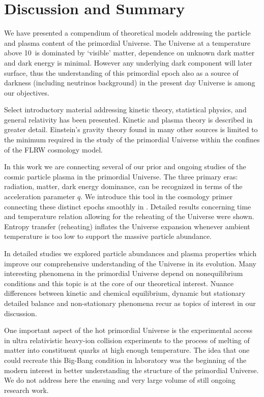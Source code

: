 \section{Discussion and Summary}\label{part6}
We have presented a compendium of theoretical models addressing the particle and plasma content of the primordial Universe. The Universe at a temperature above 10\keV\ is dominated by `visible' matter, dependence on unknown dark matter and dark energy is minimal. However any underlying dark component will later surface, thus the understanding of this primordial epoch also as a source of darkness (including neutrinos background) in the present day Universe is among our objectives.

Select introductory material addressing kinetic theory, statistical physics, and general relativity has been presented. Kinetic and plasma theory is described in greater detail. Einstein's gravity theory found in many other sources is limited to the minimum required in the study of the primordial Universe within the confines of the FLRW cosmology model. 

In this work we are connecting several of our prior and ongoing studies of the cosmic particle plasma in the primordial Universe. The three primary eras: radiation, matter, dark energy dominance, can be recognized in terms of the acceleration parameter $q$. We introduce this tool in the cosmology primer  connecting these distinct epochs smoothly in . Detailed results concerning time and temperature relation allowing for the reheating of the Universe were shown. Entropy transfer (reheating) inflates the Universe expansion whenever ambient temperature is too low to support the massive particle abundance.

In detailed studies we explored particle abundances and plasma properties which improve our comprehensive understanding of the Universe in its evolution. Many interesting phenomena in the primordial Universe depend on nonequilibrium conditions and this topic is at the core of our theoretical interest. Nuance differences between kinetic and chemical equilibrium, dynamic but stationary detailed balance and non-stationary phenomena recur as topics of interest in our discussion. 

One important aspect of the hot primordial Universe is the experimental access in ultra relativistic heavy-ion collision experiments to the process of melting of matter into constituent quarks at high enough temperature. The idea that one could recreate this Big-Bang condition in laboratory was the beginning of the modern interest in better understanding the structure of the primordial Universe. We do not address here the ensuing and very large volume of still ongoing research work. 

